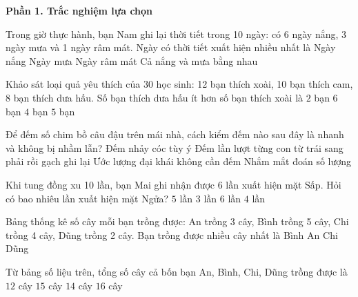 \textbf{Phần 1. Trắc nghiệm lựa chọn}

\begin{ex} %
Trong giờ thực hành, bạn Nam ghi lại thời tiết trong 10 ngày: có 6 ngày nắng, 3 ngày mưa và 1 ngày râm mát. Ngày có thời tiết xuất hiện nhiều nhất là
\choice
{\True Ngày nắng}
{Ngày mưa}
{Ngày râm mát}
{Cả nắng và mưa bằng nhau}
\end{ex}

\begin{ex} %
Khảo sát loại quả yêu thích của 30 học sinh: 12 bạn thích xoài, 10 bạn thích cam, 8 bạn thích dưa hấu. Số bạn thích dưa hấu ít hơn số bạn thích xoài là
\choice
{$2$ bạn}
{$6$ bạn}
{\True $4$ bạn}
{$5$ bạn}
\end{ex}

\begin{ex} %
Để đếm số chim bồ câu đậu trên mái nhà, cách kiểm đếm nào sau đây là nhanh và không bị nhầm lẫn?
\choice
{Đếm nhảy cóc tùy ý}
{\True Đếm lần lượt từng con từ trái sang phải rồi gạch ghi lại}
{Ước lượng đại khái không cần đếm}
{Nhắm mắt đoán số lượng}
\end{ex}

\begin{ex} %
Khi tung đồng xu 10 lần, bạn Mai ghi nhận được 6 lần xuất hiện mặt Sấp. Hỏi có bao nhiêu lần xuất hiện mặt Ngửa?
\choice
{$5$ lần}
{$3$ lần}
{$6$ lần}
{\True $4$ lần}
\end{ex}

\begin{ex} %
Bảng thống kê số cây mỗi bạn trồng được: An trồng 3 cây, Bình trồng 5 cây, Chi trồng 4 cây, Dũng trồng 2 cây. Bạn trồng được nhiều cây nhất là
\choice
{\True Bình}
{An}
{Chi}
{Dũng}
\end{ex}

\begin{ex} %
Từ bảng số liệu trên, tổng số cây cả bốn bạn An, Bình, Chi, Dũng trồng được là
\choice
{$12$ cây}
{$15$ cây}
{\True $14$ cây}
{$16$ cây}
\end{ex}


